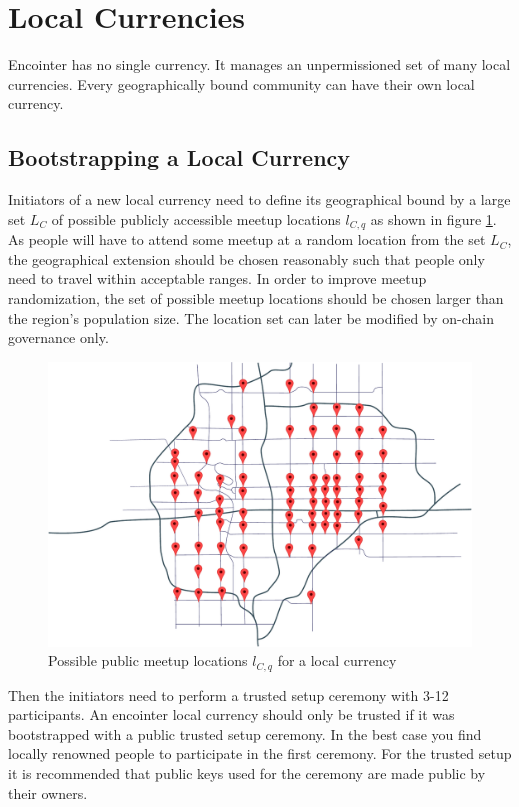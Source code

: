 \documentclass[conference]{IEEEtran}
\begin{document}
\section{Local Currencies}
Encointer has no single currency. It manages an unpermissioned set of many local currencies. Every geographically bound community can have their own local currency.

\subsection{Bootstrapping a Local Currency}
Initiators of a new local \encointer currency need to define its geographical bound by a large set $L_C$ of possible publicly accessible meetup locations $l_{C,q}$ as shown in figure \ref{fig:map}. As people will have to attend some meetup at a random location from the set $L_C$, the geographical extension should be chosen reasonably such that people only need to travel within acceptable ranges. In order to improve meetup randomization, the set of possible meetup locations should be chosen larger than the region's population size. The location set can later be modified by on-chain governance only. 

\begin{figure}
	\centering
	\def\svgwidth{\columnwidth}
	\includegraphics[width=\columnwidth]{meetup_locations_map.pdf}
	\caption{Possible public meetup locations $l_{C,q}$ for a local currency}
	\label{fig:map}
\end{figure}

Then the initiators need to perform a trusted setup ceremony with 3-12 participants. An encointer local currency should only be trusted if it was bootstrapped with a public trusted setup ceremony. In the best case you find locally renowned people to participate in the first ceremony. For the trusted setup it is recommended that public keys used for the ceremony are made public by their owners.
\end{document}
